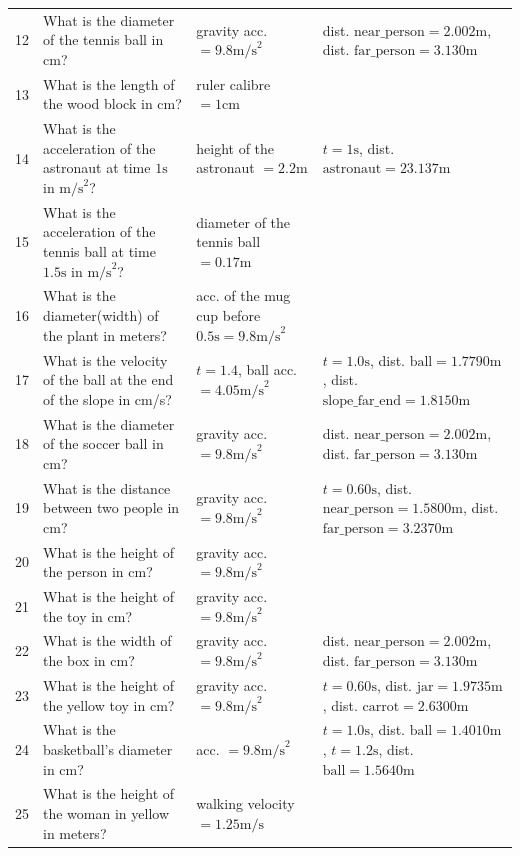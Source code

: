 \begin{tabular}{@{} c L{7.5cm} L{4.0cm} L{3.0cm} @{}}
12 & What is the diameter of the tennis ball in cm? & gravity acc. $= 9.8\text{m/s}^2$ & dist. $\text{near\_person} = 2.002\text{m}$, dist. $\text{far\_person} = 3.130\text{m}$ \\
13 & What is the length of the wood block in cm? & ruler calibre $= 1\text{cm}$ & \\
14 & What is the acceleration of the astronaut at time $1\text{s}$ in $\text{m/s}^2$? & height of the astronaut $= 2.2\text{m}$ & $t=1\text{s}$, dist. $\text{astronaut} = 23.137\text{m}$ \\
15 & What is the acceleration of the tennis ball at time $1.5\text{s}$ in $\text{m/s}^2$? & diameter of the tennis ball $= 0.17\text{m}$ & \\
16 & What is the diameter(width) of the plant in meters? & acc. of the mug cup before $0.5\text{s} = 9.8\text{m/s}^2$ & \\
17 & What is the velocity of the ball at the end of the slope in cm/s? & $t=1.4$, ball acc. $= 4.05\text{m/s}^2$ & $t=1.0\text{s}$, dist. $\text{ball} = 1.7790\text{m}$, dist. $\text{slope\_far\_end} = 1.8150\text{m}$ \\
18 & What is the diameter of the soccer ball in cm? & gravity acc. $= 9.8\text{m/s}^2$ & dist. $\text{near\_person} = 2.002\text{m}$, dist. $\text{far\_person} = 3.130\text{m}$ \\
19 & What is the distance between two people in cm? & gravity acc. $= 9.8\text{m/s}^2$ & $t=0.60\text{s}$, dist. $\text{near\_person} = 1.5800\text{m}$, dist. $\text{far\_person} = 3.2370\text{m}$ \\
20 & What is the height of the person in cm? & gravity acc. $= 9.8\text{m/s}^2$ & \\
21 & What is the height of the toy in cm? & gravity acc. $= 9.8\text{m/s}^2$ & \\
22 & What is the width of the box in cm? & gravity acc. $= 9.8\text{m/s}^2$ & dist. $\text{near\_person} = 2.002\text{m}$, dist. $\text{far\_person} = 3.130\text{m}$ \\
23 & What is the height of the yellow toy in cm? & gravity acc. $= 9.8\text{m/s}^2$ & $t=0.60\text{s}$, dist. $\text{jar} = 1.9735\text{m}$, dist. $\text{carrot} = 2.6300\text{m}$ \\
24 & What is the basketball's diameter in cm? & acc. $= 9.8 \text{m/s}^2$ & $t=1.0\text{s}$, dist. $\text{ball} = 1.4010\text{m}$, $t=1.2\text{s}$, dist. $\text{ball} = 1.5640\text{m}$ \\
25 & What is the height of the woman in yellow in meters? & walking velocity $= 1.25\text{m/s}$ & \\

\end{tabular}
